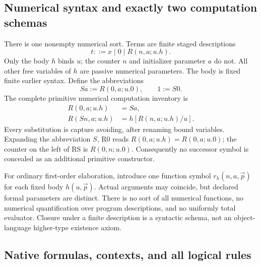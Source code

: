 \documentclass[11pt,letterpaper]{article}
\theoremstyle{definition}\newtheorem{definition}[theorem]{Definition}
\theoremstyle{remark}\newtheorem{remark}[theorem]{Remark}
\begin{document}
\subsection{Numerical syntax and exactly two computation schemas}

There is one nonempty numerical sort. Terms are finite staged descriptions
\[
                  t::=x\mid0\mid R(n,a;u.h).
\]
Only the body $h$ binds $u$; the counter $n$ and initializer parameter $a$
do not. All other free variables of $h$ are passive numerical parameters.
The body is fixed finite earlier syntax. Define the abbreviations
\[
                   Sa:=R(0,a;u.0),\qquad 1:=S0.
\]
The complete primitive numerical computation inventory is
\begin{align}
 R(0,a;u.h)&=Sa,\tag{R0}\label{eq:r0}\\
 R(Sn,a;u.h)&=h[R(n,a;u.h)/u].\tag{RS}\label{eq:rs}
\end{align}
Every substitution is capture avoiding, after renaming bound variables.
Expanding the abbreviation $S$, R0 reads
$R(0,a;u.h)=R(0,a;u.0)$; the counter on the left of RS is
$R(0,n;u.0)$. Consequently no successor symbol is concealed as an
additional primitive constructor.

For ordinary first-order elaboration, introduce one function symbol
$r_h(n,a,\vec p)$ for each fixed body $h(u,\vec p)$. Actual arguments
may coincide, but declared formal parameters are distinct. There is no
sort of all numerical functions, no numerical quantification over program
descriptions, and no uniformly total evaluator. Closure under a finite
description is a syntactic schema, not an object-language higher-type
existence axiom.

\subsection{Native formulas, contexts, and all logical rules}
\end{document}
